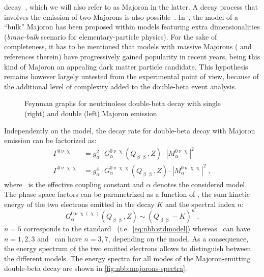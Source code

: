 decay~\cite{Carone1993}, which we will also refer to as Majoron in the latter. A decay
process that involves the emission of two Majorons is also possible~\cite{Bamert1995}.
In~\cite{Mohpatra2000}, the model of a ``bulk'' Majoron has been proposed within models
featuring extra dimensionalities (\emph{brane-bulk} scenario for elementary-particle
physics).
\newpar
For the sake of completeness, it has to be mentioned that models with massive Majorons
(\cite{Blum2018} and references therein) have progressively gained popularity in recent
years, being this kind of Majoron an appealing dark matter particle candidate. This
hypothesis remains however largely untested from the experimental point of view, because
of the additional level of complexity added to the double-beta event analysis.

\begin{figure}
  \centering%
  \caption{%
    Feynman graphs for neutrinoless double-beta decay with single (right) and double
    (left) Majoron emission.
  }\label{fig:nbb:majfeydiag}
\end{figure}

Independently on the model, the decay rate for double-beta decay with Majoron emission can
be factorized as:
\begin{align*}
  \Gamma^{0\upnu\upchi}  &= g_\alpha^2 \cdot G_\alpha^{0\upnu\upchi}(Q_{\upbeta\upbeta}, Z)
    \cdot |M_\alpha^{0\upnu\upchi}|^2 \\
  \Gamma^{0\upnu\upchi\upchi} &= g_\alpha^4 \cdot G_\alpha^{0\upnu\upchi\upchi}(Q_{\upbeta\upbeta}, Z)
    \cdot |M_\alpha^{0\upnu\upchi\upchi}|^2 \;,
\end{align*}
where \ga\ is the effective coupling constant and $\alpha$ denotes the considered
model. The phase space factors can be parametrized as a function of \qbb, the sum kinetic
energy of the two electrons emitted in the decay $K$ and the spectral index $n$:
\[
  G_\alpha^{0\upnu\upchi(\upchi)}(Q_{\upbeta\upbeta}, Z)
    \sim {(Q_{\upbeta\upbeta} - K)}^n \;.
\]
$n = 5$ corresponds to the standard \nnbb\ (i.e.~\cref{eq:nbb:stdmodel}) whereas \onbbx\
can have $n = 1, 2, 3$ and \onbbxx\ can have $n = 3, 7$, depending on the model. As a
consequence, the energy spectrum of the two emitted electrons allows to distinguish
between the different models. The energy spectra for all modes of the Majoron-emitting
double-beta decay are shown in \cref{fig:nbb:majorons-spectra}.

